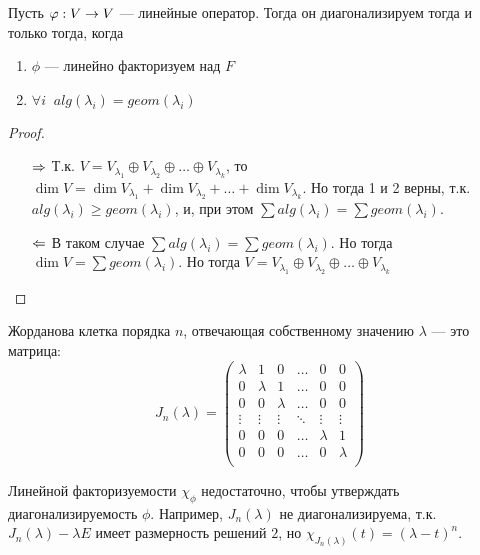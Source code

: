 \begin{theorem}
    Пусть \(\varphi: V \rightarrow V\) --- линейные оператор. Тогда он диагонализируем тогда и только тогда, когда 
    \begin{enumerate}
        \item \(\phi\) --- линейно факторизуем над \(F\)
        \item \(\forall i\;\; alg(\lambda_i) = geom(\lambda_i)\)
    \end{enumerate}
\end{theorem}
\begin{proof}\indent
    \begin{enumerate}
        \item[\(\Rightarrow\)] Т.к. \(V = V_{\lambda_1} \oplus V_{\lambda_2} \oplus \dots \oplus V_{\lambda_k}\), то \(\dim V = \dim V_{\lambda_1} + \dim V_{\lambda_2} + \dots + \dim V_{\lambda_k}\). Но тогда 1 и 2 верны, т.к. \(alg(\lambda_i) \ge geom(\lambda_i)\), и, при этом \(\sum alg(\lambda_i) = \sum geom(\lambda_i)\).
        \item[\(\Leftarrow\)] В таком случае \(\sum alg(\lambda_i) = \sum geom(\lambda_i)\). Но тогда \(\dim V = \sum geom(\lambda_i)\). Но тогда \(V = V_{\lambda_1} \oplus V_{\lambda_2} \oplus \dots \oplus V_{\lambda_k}\)
    \end{enumerate}
\end{proof}

\begin{definition}
    Жорданова клетка порядка \(n\), отвечающая собственному значению \(\lambda\) --- это матрица:
    \[J_n(\lambda) = \left(\begin{array}{cccccc}
        \lambda & 1 & 0 & \dots & 0 & 0 \\
        0 & \lambda & 1 & \dots & 0 & 0 \\
        0 & 0 & \lambda & \dots & 0 & 0 \\
        \vdots & \vdots & \vdots & \ddots & \vdots & \vdots \\
        0 & 0 & 0 & \dots & \lambda & 1 \\
        0 & 0 & 0 & \dots & 0 & \lambda \\
    \end{array}\right)\]
\end{definition}

\begin{note}
    Линейной факторизуемости \(\chi_\phi\) недостаточно, чтобы утверждать диагонализируемость \(\phi\). Например, \(J_n(\lambda)\) не диагонализируема, т.к. \(J_n(\lambda) - \lambda E\) имеет размерность решений \(2\), но \(\chi_{J_n(\lambda)}(t) = (\lambda - t)^n\).
\end{note}

